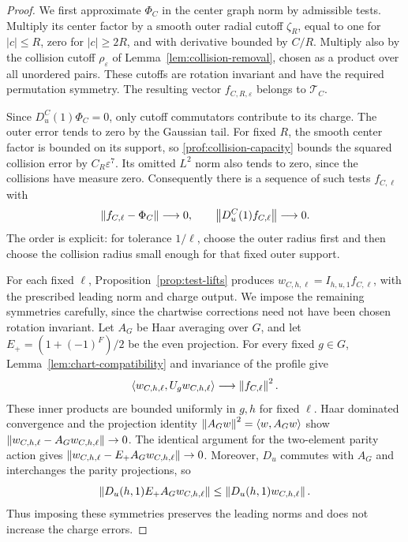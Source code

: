 \begin{proof}
We first approximate \(\Phi_C\) in the center graph norm by admissible
tests. Multiply its center factor by a smooth outer radial cutoff
\(\zeta_R\), equal to one for \(|c|\le R\), zero for \(|c|\ge2R\), and
with derivative bounded by \(C/R\). Multiply also by the collision cutoff
\(\rho_\varepsilon\) of Lemma~\ref{lem:collision-removal}, chosen as a
product over all unordered pairs. These cutoffs are rotation invariant
and have the required permutation symmetry. The resulting vector
\(f_{C,R,\varepsilon}\) belongs to \(\mathcal T_C\).

Since \(D_u^C(1)\Phi_C=0\), only cutoff commutators contribute to its
charge. The outer error tends to zero by the Gaussian tail. For fixed
\(R\), the smooth center factor is bounded on its support, so
\eqref{prof:collision-capacity} bounds the squared collision error by
\(C_R\varepsilon^7\). Its omitted \(L^2\) norm also tends to zero, since
the collisions have measure zero. Consequently there is a sequence of
such tests \(f_{C,\ell}\) with
\begin{equation}\label{count:center-test-approximation}
 \left\lVert f_{C,\ell}-\Phi_C\right\rVert\longrightarrow0,
 \qquad \left\lVert D_u^C(1)f_{C,\ell}\right\rVert\longrightarrow0.
\end{equation}
The order is explicit: for tolerance \(1/\ell\), choose the outer radius
first and then choose the collision radius small enough for that fixed
outer support.

For each fixed \(\ell\), Proposition~\ref{prop:test-lifts} produces
\(w_{C,h,\ell}=I_{h,u,1}f_{C,\ell}\), with the prescribed leading norm
and charge output. We impose the remaining symmetries carefully, since
the chartwise corrections need not have been chosen rotation invariant.
Let \(A_G\) be Haar averaging over \(G\), and let
\(E_+=(1+(-1)^F)/2\) be the even projection. For every fixed \(g\in G\),
Lemma~\ref{lem:chart-compatibility} and invariance of the profile give
\[
 \left\langle w_{C,h,\ell},U_gw_{C,h,\ell}\right\rangle
                          \longrightarrow\left\lVert f_{C,\ell}\right\rVert^2.
\]
These inner products are bounded uniformly in \(g,h\) for fixed
\(\ell\). Haar dominated convergence and the projection identity
\(\left\lVert A_Gw\right\rVert^2=\left\langle w,A_Gw\right\rangle\) show
\(\left\lVert w_{C,h,\ell}-A_Gw_{C,h,\ell}\right\rVert\to0\). The identical argument
for the two-element parity action gives
\(\left\lVert w_{C,h,\ell}-E_+A_Gw_{C,h,\ell}\right\rVert\to0\).
Moreover, \(D_u\) commutes with \(A_G\) and interchanges the parity
projections, so
\[
 \left\lVert D_u(h,1)E_+A_Gw_{C,h,\ell}\right\rVert
                  \le\left\lVert D_u(h,1)w_{C,h,\ell}\right\rVert.
\]
Thus imposing these symmetries preserves the leading norms and does not
increase the charge errors.


\end{proof}
